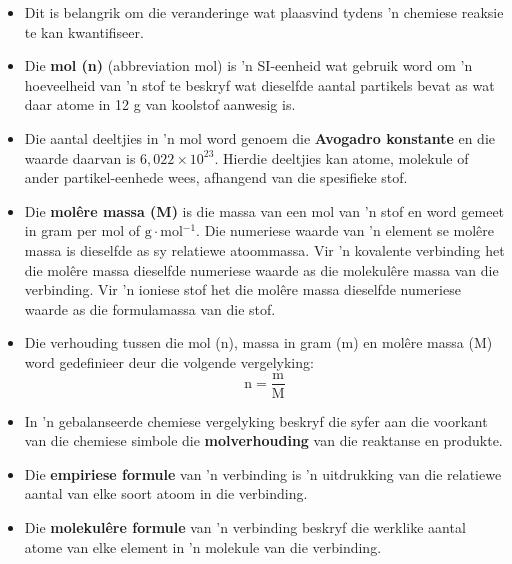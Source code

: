 \pagebreak
{}
            \nopagebreak
      \label{m38712*id285735}\begin{itemize}[noitemsep]
\item Dit is belangrik om die veranderinge wat plaasvind tydens  'n chemiese reaksie te kan kwantifiseer.
\item Die \textbf{mol (n)} (abbreviation mol) is  'n SI-eenheid wat gebruik word om 'n hoeveelheid van   'n stof te beskryf wat dieselfde aantal partikels bevat as wat daar atome in 12 g van koolstof aanwesig is.
\item Die aantal deeltjies in  'n mol word genoem die \textbf{Avogadro konstante} en die waarde daarvan is $6,022 \times {10}^{23}$. Hierdie deeltjies kan atome, molekule of ander partikel-eenhede wees, afhangend van die spesifieke stof.
\item Die \textbf{mol\^{e}re massa (M)} is die massa van een mol van  'n stof en word gemeet in gram per mol of $\text{g} \cdot \text{mol}{}^{-1}$. Die numeriese waarde van  'n element se molêre massa is dieselfde as sy relatiewe atoommassa. Vir  'n kovalente verbinding het die molêre massa dieselfde numeriese waarde as die molekulêre massa van die verbinding. Vir  'n ioniese stof het die molêre massa dieselfde numeriese waarde as die formulamassa van die stof.
\item Die verhouding tussen die mol (n), massa in gram (m) en molêre massa (M) word gedefinieer deur die volgende vergelyking:
\label{m38712*id285862}\nopagebreak\noindent{}
    \begin{equation*}
    \text{n}=\frac{\text{m}}{\text{M}}
      \end{equation*}
\item In  'n gebalanseerde chemiese vergelyking beskryf die syfer aan die voorkant van die chemiese simbole die \textbf{molverhouding} van die reaktanse en produkte.
\item Die \textbf{empiriese formule} van  'n verbinding is  'n uitdrukking van die relatiewe aantal van elke soort atoom in die verbinding.
\item Die \textbf{molekul\^{e}re formule} van  'n verbinding beskryf die werklike aantal atome van elke element in  'n molekule van die verbinding.

\end{itemize}
